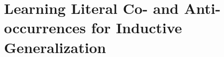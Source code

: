 \chapter{Learning Literal Co- and Anti-occurrences for Inductive Generalization}
\label{chap:dopey}







